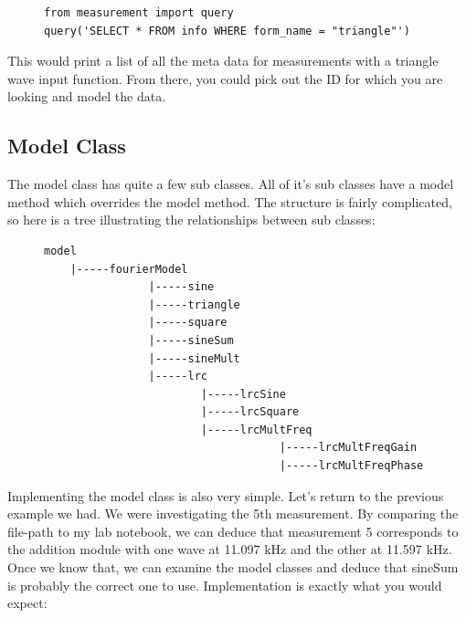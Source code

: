 \documentclass{article}
\begin{document}
\begin{figure}[H]
\centering
\begin{minipage}{1\textwidth}
\begin{tcolorbox}
\begin{verbatim}
from measurement import query
query('SELECT * FROM info WHERE form_name = "triangle"')
\end{verbatim}
\end{tcolorbox}
\end{minipage}
\end{figure}

This would print a list of all the meta data for measurements with a triangle
wave input function. From there, you could pick out the ID for which you are
looking and model the data.


\subsection{Model Class}%
\label{sub:model_class}

The model class has quite a few sub classes. All of it's sub classes have a
model method which overrides the model method. The structure is fairly
complicated, so here is a tree illustrating the relationships between sub
classes:

\begin{figure}[H]
\centering
\begin{minipage}{1\textwidth}
\begin{tcolorbox}
\begin{verbatim}
model
    |-----fourierModel
                |-----sine
                |-----triangle
                |-----square
                |-----sineSum
                |-----sineMult
                |-----lrc
                        |-----lrcSine
                        |-----lrcSquare
                        |-----lrcMultFreq
                                    |-----lrcMultFreqGain
                                    |-----lrcMultFreqPhase
\end{verbatim}
\end{tcolorbox}
\end{minipage}
\end{figure}

Implementing the model class is also very simple. Let's return to the previous
example we had. We were investigating the 5th measurement. By comparing the
file-path to my lab notebook, we can deduce that measurement 5 corresponds to
the addition module with one wave at 11.097 kHz and the other at 11.597 kHz.
Once we know that, we can examine the model classes and deduce that sineSum is
probably the correct one to use. Implementation is exactly what you would
expect:
\end{document}
